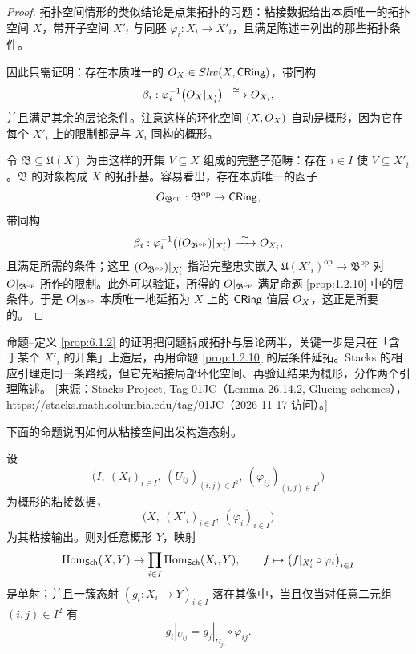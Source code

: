 \begin{proof}
拓扑空间情形的类似结论是点集拓扑的习题：粘接数据给出本质唯一的拓扑空间 $X$，带开子空间 $X'_i$ 与同胚 $\varphi_i:X_i\to X'_i$，且满足陈述中列出的那些拓扑条件。

因此只需证明：存在本质唯一的 $O_X\in Shv(X,\mathsf{CRing})$，带同构
\[
\beta_i:\varphi_i^{-1}\bigl(\cO_X|_{X'_i}\bigr)\xrightarrow{\ \simeq\ }\cO_{X_i},
\]
并且满足其余的层论条件。注意这样的环化空间 $(X,O_X)$ 自动是概形，因为它在每个 $X'_i$ 上的限制都是与 $X_i$ 同构的概形。

令 $\mathfrak{B}\subseteq\mathfrak{U}(X)$ 为由这样的开集 $V\subseteq X$ 组成的完整子范畴：存在 $i\in I$ 使 $V\subseteq X'_i$。$\mathfrak{B}$ 的对象构成 $X$ 的拓扑基。容易看出，存在本质唯一的函子
\[
O_{\mathfrak{B}^{\mathrm{op}}}:\mathfrak{B}^{\mathrm{op}}\to\mathsf{CRing},
\]
带同构
\[
\beta_i:\varphi_i^{-1}\bigl((O_{\mathfrak{B}^{\mathrm{op}}})|_{X'_i}\bigr)
\xrightarrow{\ \simeq\ }O_{X_i},
\]
且满足所需的条件；这里 $(O_{\mathfrak{B}^{\mathrm{op}}})|_{X'_i}$ 指沿完整忠实嵌入 $\mathfrak{U}(X'_i)^{\mathrm{op}}\to\mathfrak{B}^{\mathrm{op}}$ 对 $O|_{\mathfrak{B}^{\mathrm{op}}}$ 所作的限制。此外可以验证，所得的 $O|_{\mathfrak{B}^{\mathrm{op}}}$ 满足命题 \ref{prop:1.2.10} 中的层条件。于是 $O|_{\mathfrak{B}^{\mathrm{op}}}$ 本质唯一地延拓为 $X$ 上的 $\mathsf{CRing}$ 值层 $O_X$，这正是所要的。
\end{proof}

\begin{yizhu}
命题--定义 \ref{prop:6.1.2} 的证明把问题拆成拓扑与层论两半，关键一步是只在「含于某个 $X'_i$ 的开集」上造层，再用命题 \ref{prop:1.2.10} 的层条件延拓。Stacks 的相应引理走同一条路线，但它先粘接局部环化空间、再验证结果为概形，分作两个引理陈述。
[来源：Stacks Project, Tag 01JC（Lemma 26.14.2, Glueing schemes），\url{https://stacks.math.columbia.edu/tag/01JC}（2026-11-17 访问）。]
\end{yizhu}

下面的命题说明如何从粘接空间出发构造态射。

\begin{proposition}\label{prop:6.1.3}
设
\[
\bigl(I,\ (X_i)_{i\in I},\ (U_{ij})_{(i,j)\in I^2},\ (\varphi_{ij})_{(i,j)\in I^2}\bigr)
\]
为概形的粘接数据，
\[
\bigl(X,\ (X'_i)_{i\in I},\ (\varphi_i)_{i\in I}\bigr)
\]
为其粘接输出。则对任意概形 $Y$，映射
\[
\operatorname{Hom}_{\mathsf{Sch}}(X,Y)\to\prod_{i\in I}\operatorname{Hom}_{\mathsf{Sch}}(X_i,Y),
\qquad
f\mapsto\bigl(f|_{X'_i}\circ\varphi_i\bigr)_{i\in I}
\]
是单射；并且一簇态射 $(g_i:X_i\to Y)_{i\in I}$ 落在其像中，当且仅当对任意二元组 $(i,j)\in I^2$ 有
\[
g_i|_{U_{ij}}=g_j|_{U_{ji}}\circ\varphi_{ij}.
\]
\end{proposition}

